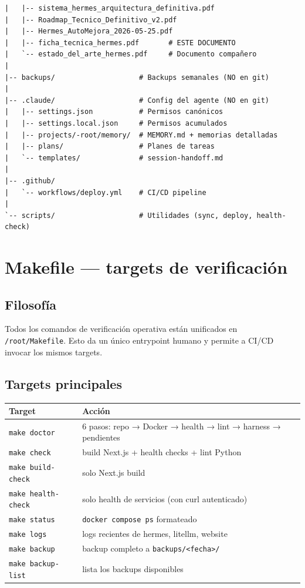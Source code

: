 \documentclass[11pt,a4paper]{article}
\begin{document}
\begin{lstlisting}[language=bashx]
|   |-- sistema_hermes_arquitectura_definitiva.pdf
|   |-- Roadmap_Tecnico_Definitivo_v2.pdf
|   |-- Hermes_AutoMejora_2026-05-25.pdf
|   |-- ficha_tecnica_hermes.pdf       # ESTE DOCUMENTO
|   `-- estado_del_arte_hermes.pdf     # Documento compañero
|
|-- backups/                    # Backups semanales (NO en git)
|
|-- .claude/                    # Config del agente (NO en git)
|   |-- settings.json           # Permisos canónicos
|   |-- settings.local.json     # Permisos acumulados
|   |-- projects/-root/memory/  # MEMORY.md + memorias detalladas
|   |-- plans/                  # Planes de tareas
|   `-- templates/              # session-handoff.md
|
|-- .github/
|   `-- workflows/deploy.yml    # CI/CD pipeline
|
`-- scripts/                    # Utilidades (sync, deploy, health-check)
\end{lstlisting}

\newpage

\section{Makefile — targets de verificación}

\subsection{Filosofía}

Todos los comandos de verificación operativa están unificados en \texttt{/root/Makefile}. Esto da un único entrypoint humano y permite a CI/CD invocar los mismos targets.

\subsection{Targets principales}

\begin{center}
\begin{tabular}{|l|p{9cm}|}
\hline
\rowcolor{hermesblue}\color{white}\textbf{Target} & \color{white}\textbf{Acción}\\
\hline
\texttt{make doctor} & 6 pasos: repo → Docker → health → lint → harness → pendientes\\
\texttt{make check} & build Next.js + health checks + lint Python\\
\texttt{make build-check} & solo Next.js build\\
\texttt{make health-check} & solo health de servicios (con curl autenticado)\\
\texttt{make status} & \texttt{docker compose ps} formateado\\
\texttt{make logs} & logs recientes de hermes, litellm, website\\
\texttt{make backup} & backup completo a \texttt{backups/<fecha>/}\\
\texttt{make backup-list} & lista los backups disponibles\\
\hline
\end{tabular}
\end{center}
\end{document}
